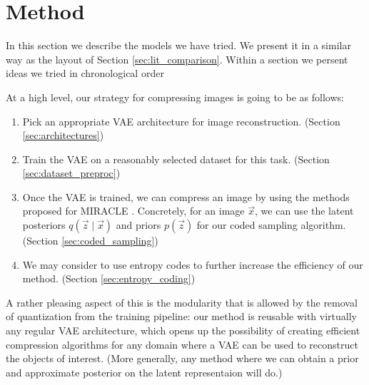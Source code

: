 
\chapter{Method}
\label{chapter:method}

\graphicspath{{../img/thesis/}{../img/plots/vae_latents/}}

\label{sec:our_method}
\par
In this section we describe the models we have tried. We present it in a similar
way as the layout of Section \ref{sec:lit_comparison}. Within a section we
persent ideas we tried in chronological order

At a high level, our strategy for compressing images is going to be as follows:

\begin{enumerate}
\item Pick an appropriate VAE architecture for image reconstruction. (Section
  \ref{sec:architectures})
\item Train the VAE on a reasonably selected dataset for this task. (Section
  \ref{sec:dataset_preproc})
\item Once the VAE is trained, we can compress an image by using the methods
  proposed for MIRACLE \cite{havasi2018minimal}. Concretely, for an image
  $\vec{x}$, we can use the latent posteriors $q(\vec{z} \mid \vec{x})$ and
  priors $p(\vec{z})$ for our coded sampling algorithm. (Section
  \ref{sec:coded_sampling})
\item We may consider to use entropy codes to further increase the efficiency of
  our method. (Section \ref{sec:entropy_coding})
\end{enumerate}

\par
A rather pleasing aspect of this is the modularity that is allowed by the
removal of quantization from the training pipeline: our method is reusable with
virtually any regular VAE architecture, which opens up the possibility of
creating efficient compression algorithms for any domain where a VAE can be used
to reconstruct the objects of interest. (More generally, any method where we
can obtain a prior and approximate posterior on the latent representaion will do.)

